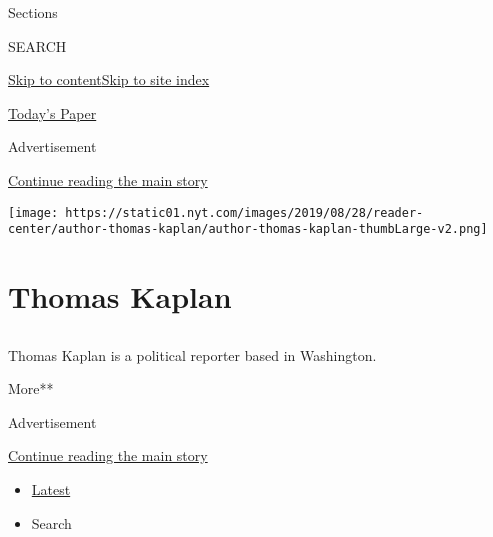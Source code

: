 Sections

SEARCH

\protect\hyperlink{site-content}{Skip to
content}\protect\hyperlink{site-index}{Skip to site index}

\href{https://myaccount.nytimes.com/auth/login?response_type=cookie\&client_id=vi}{}

\href{https://www.nytimes.com/section/todayspaper}{Today's Paper}

Advertisement

\protect\hyperlink{after-top}{Continue reading the main story}

\texttt{[image: https://static01.nyt.com/images/2019/08/28/reader-center/author-thomas-kaplan/author-thomas-kaplan-thumbLarge-v2.png]}

\hypertarget{thomas-kaplan}{%
\section{Thomas Kaplan}\label{thomas-kaplan}}

\subsection{}

Thomas Kaplan is a political reporter based in Washington.

More**

Advertisement

\protect\hyperlink{after-mid1}{Continue reading the main story}

\begin{itemize}
\tightlist
\item
  \protect\hyperlink{stream-panel}{Latest}
\item
  Search
\end{itemize}

